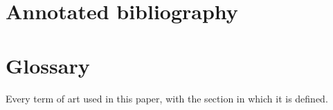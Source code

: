 \documentclass[11pt,a4paper]{article}
\begin{document}
\section{Annotated bibliography}
\label{sec:annotbib}





\section{Glossary}
\label{sec:glossary}

Every term of art used in this paper, with the section in which it is defined.


\end{document}
